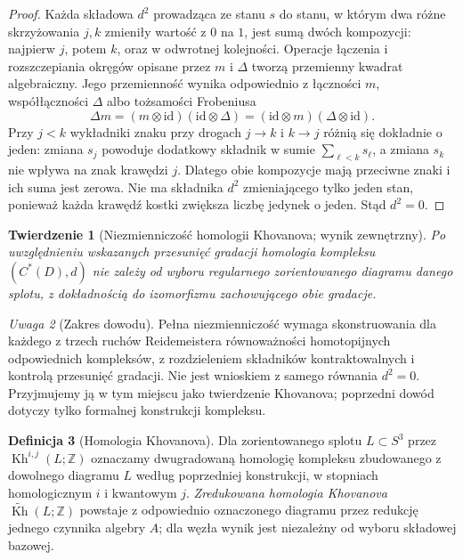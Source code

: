 \documentclass[11pt,a4paper]{report}
\numberwithin{equation}{section}
\theoremstyle{plain}
\newtheorem{twierdzenie}{Twierdzenie}[section]
\theoremstyle{definition}
\newtheorem{definicja}[twierdzenie]{Definicja}
\theoremstyle{remark}
\newtheorem{uwaga}[twierdzenie]{Uwaga}
\begin{document}
\begin{proof}
Każda składowa $d^2$ prowadząca ze stanu $s$ do stanu,
w którym dwa różne skrzyżowania $j,k$ zmieniły wartość
z $0$ na $1$, jest sumą dwóch kompozycji: najpierw $j$,
potem $k$, oraz w odwrotnej kolejności. Operacje
łączenia i rozszczepiania okręgów opisane przez $m$
i $\Delta$ tworzą przemienny kwadrat algebraiczny.
Jego przemienność wynika odpowiednio z łączności
$m$, współłączności $\Delta$ albo tożsamości Frobeniusa
\[
\Delta m=(m\otimes\mathrm{id})(\mathrm{id}\otimes\Delta)
=(\mathrm{id}\otimes m)(\Delta\otimes\mathrm{id}).
\]
Przy $j<k$ wykładniki znaku przy drogach $j\to k$
i $k\to j$ różnią się dokładnie o jeden: zmiana $s_j$
powoduje dodatkowy składnik w sumie $\sum_{\ell<k}s_\ell$,
a zmiana $s_k$ nie wpływa na znak krawędzi $j$.
Dlatego obie kompozycje mają przeciwne znaki
i ich suma jest zerowa. Nie ma składnika $d^2$
zmieniającego tylko jeden stan, ponieważ każda krawędź
kostki zwiększa liczbę jedynek o jeden. Stąd $d^2=0$.
\end{proof}

\begin{twierdzenie}[Niezmienniczość homologii Khovanova; wynik zewnętrzny]
Po uwzględnieniu wskazanych przesunięć gradacji
homologia kompleksu $(C^*(D),d)$ nie zależy od wyboru
regularnego zorientowanego diagramu danego splotu,
z dokładnością do izomorfizmu zachowującego obie gradacje.
\end{twierdzenie}

\begin{uwaga}[Zakres dowodu]
Pełna niezmienniczość wymaga skonstruowania dla każdego
z trzech ruchów Reidemeistera równoważności homotopijnych
odpowiednich kompleksów, z rozdzieleniem składników
kontraktowalnych i kontrolą przesunięć gradacji.
Nie jest wnioskiem z samego równania $d^2=0$.
Przyjmujemy ją w tym miejscu jako twierdzenie Khovanova;
poprzedni dowód dotyczy tylko formalnej konstrukcji kompleksu.
\end{uwaga}

\begin{definicja}[Homologia Khovanova]
Dla zorientowanego splotu $L\subset S^3$ przez
$\operatorname{Kh}^{i,j}(L;\mathbb Z)$ oznaczamy dwugradowaną
homologię kompleksu zbudowanego z dowolnego diagramu $L$
według poprzedniej konstrukcji, w stopniach homologicznym $i$
i kwantowym $j$. \emph{Zredukowana homologia Khovanova}
$\widetilde{\operatorname{Kh}}(L;\mathbb Z)$ powstaje
z odpowiednio oznaczonego diagramu przez redukcję
jednego czynnika algebry $A$; dla węzła wynik jest
niezależny od wyboru składowej bazowej.
\end{definicja}
\end{document}
